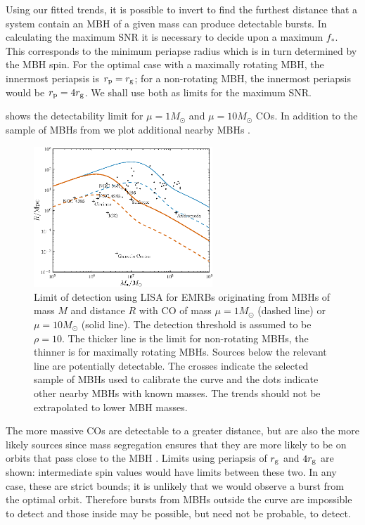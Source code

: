 Using our fitted trends, it is possible to invert  to find the furthest distance that a system contain an MBH of a given mass can produce detectable bursts. In calculating the maximum SNR it is necessary to decide upon a maximum $f_\ast$. This corresponds to the minimum periapse radius which is in turn determined by the MBH spin. For the optimal case with a maximally rotating MBH, the innermost periapsis is $r_\mathrm{p} = r_\mathrm{g}$; for a non-rotating MBH, the innermost periapsis would be $r_\mathrm{p} = 4r_\mathrm{g}$. We shall use both as limits for the maximum SNR.

 shows the detectability limit for $\mu = 1 M_\odot$ and $\mu = 10 M_\odot$ COs. In addition to the sample of MBHs from  we plot additional nearby MBHs \citep[see][and references therein]{Graham2008,Graham2011,Graham2013}.
\begin{figure}
\centering
 \includegraphics[width=0.6\textwidth]{./images/Fig_M_R_detect_1}
 \caption{Limit of detection using LISA for EMRBs originating from MBHs of mass $M$ and distance $R$ with CO of mass $\mu = 1 M_\odot$ (dashed line) or $\mu = 10 M_\odot$ (solid line). The detection threshold is assumed to be $\rho = 10$. The thicker line is the limit for non-rotating MBHs, the thinner is for maximally rotating MBHs. Sources below the relevant line are potentially detectable. The crosses indicate the selected sample of MBHs used to calibrate the curve and the dots indicate other nearby MBHs with known masses. The trends should not be extrapolated to lower MBH masses.}
 \label{fig:detect}
\end{figure}
The more massive COs are detectable to a greater distance, but are also the more likely sources since mass segregation ensures that they are more likely to be on orbits that pass close to the MBH \citep{Bahcall1977, Alexander2009, Preto2010}. Limits using periapsis of $r_\mathrm{g}$ and $4r_\mathrm{g}$ are shown: intermediate spin values would have limits between these two. In any case, these are strict bounds; it is unlikely that we would observe a burst from the optimal orbit. Therefore bursts from MBHs outside the curve are impossible to detect and those inside may be possible, but need not be probable, to detect.

